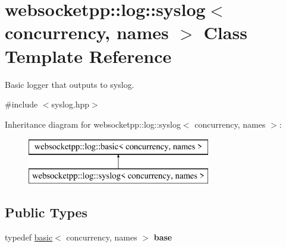 \hypertarget{classwebsocketpp_1_1log_1_1syslog}{}\section{websocketpp\+:\+:log\+:\+:syslog$<$ concurrency, names $>$ Class Template Reference}
\label{classwebsocketpp_1_1log_1_1syslog}


Basic logger that outputs to syslog.  




{\ttfamily \#include $<$syslog.\+hpp$>$}

Inheritance diagram for websocketpp\+:\+:log\+:\+:syslog$<$ concurrency, names $>$\+:\begin{figure}[H]
\begin{center}
\leavevmode
\includegraphics[height=2.000000cm]{classwebsocketpp_1_1log_1_1syslog}
\end{center}
\end{figure}
\subsection*{Public Types}
\begin{DoxyCompactItemize}
\item 
typedef \hyperlink{classwebsocketpp_1_1log_1_1basic}{basic}$<$ concurrency, names $>$ {\bfseries base}\hypertarget{classwebsocketpp_1_1log_1_1syslog_af8dc65e20aafdace6b41c36983e6401f}{}\label{classwebsocketpp_1_1log_1_1syslog_af8dc65e20aafdace6b41c36983e6401f}

\end{DoxyCompactItemize}
